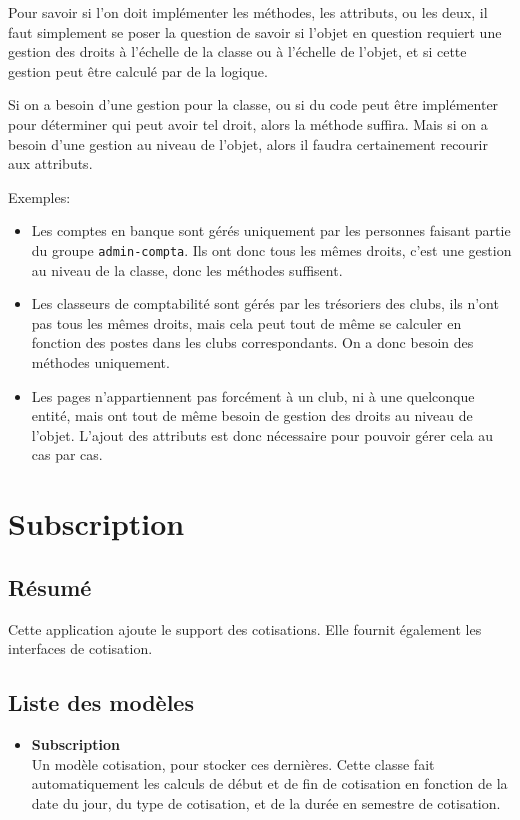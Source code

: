 \documentclass[a4paper]{report}
\begin{document}
\par Pour savoir si l'on doit implémenter les méthodes, les attributs, ou les deux, il faut simplement se poser la
question de savoir si l'objet en question requiert une gestion des droits à l'échelle de la classe ou à l'échelle de
l'objet, et si cette gestion peut être calculé par de la logique.
\par Si on a besoin d'une gestion pour la classe, ou si du code peut être implémenter pour déterminer qui peut avoir tel
droit, alors la méthode suffira. Mais si on a besoin d'une gestion au niveau de l'objet, alors il faudra certainement
recourir aux attributs.
\par Exemples:
\begin{itemize}
    \item Les comptes en banque sont gérés uniquement par les personnes faisant partie du groupe \verb#admin-compta#.
        Ils ont donc tous les mêmes droits, c'est une gestion au niveau de la classe, donc les méthodes suffisent.
    \item Les classeurs de comptabilité sont gérés par les trésoriers des clubs, ils n'ont pas tous les mêmes droits,
        mais cela peut tout de même se calculer en fonction des postes dans les clubs correspondants. On a donc besoin
        des méthodes uniquement.
    \item Les pages n'appartiennent pas forcément à un club, ni à une quelconque entité, mais ont tout de même besoin de
        gestion des droits au niveau de l'objet. L'ajout des attributs est donc nécessaire pour pouvoir gérer cela au
        cas par cas.
\end{itemize}

\section{Subscription}
\label{sec:subscription}
\subsection{Résumé}
\label{sub:resume}
\par Cette application ajoute le support des cotisations. Elle fournit également les interfaces de cotisation.

\subsection{Liste des modèles}
\label{sub:liste_des_modeles}
\begin{itemize}
    \item \textbf{Subscription} \\
        Un modèle cotisation, pour stocker ces dernières. Cette classe fait automatiquement les calculs de début et de
        fin de cotisation en fonction de la date du jour, du type de cotisation, et de la durée en semestre de
        cotisation.
\end{itemize}
\end{document}
